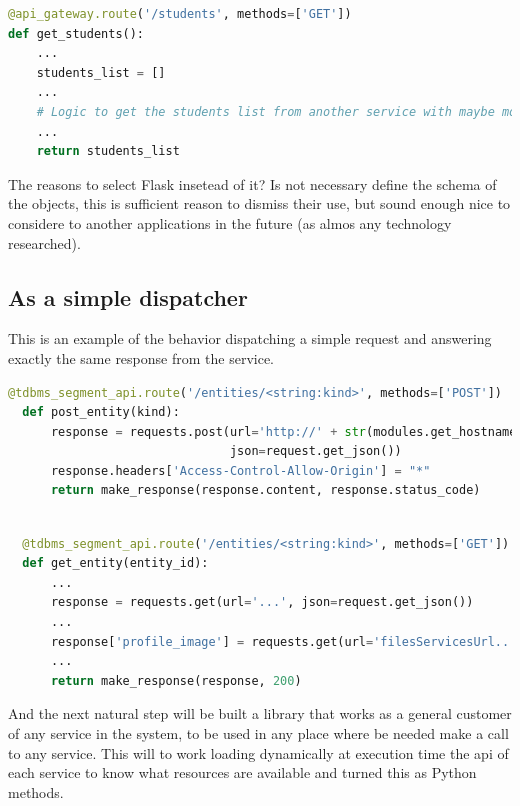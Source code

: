\begin{lstlisting}[language=python,frame=none]
@api_gateway.route('/students', methods=['GET'])
def get_students():
    ...
    students_list = []
    ...
    # Logic to get the students list from another service with maybe more logic.
    ...
    return students_list
\end{lstlisting}

\noindent The reasons to select Flask insetead of it?
Is not necessary define the schema of the objects, this is sufficient reason
to dismiss their use, but sound enough nice to considere to another
applications in the future (as almos any technology researched).


\subsection{As a simple dispatcher}

This is an example of the behavior dispatching a simple request and answering
exactly the same response from the service.

\begin{lstlisting}[language=python,frame=none]
  @tdbms_segment_api.route('/entities/<string:kind>', methods=['POST'])
  def post_entity(kind):
      response = requests.post(url='http://' + str(modules.get_hostname(module='tdbms')) + '/entities/' + str(kind),
                               json=request.get_json())
      response.headers['Access-Control-Allow-Origin'] = "*"
      return make_response(response.content, response.status_code)
\end{lstlisting}


\begin{lstlisting}[language=python,frame=none]

  @tdbms_segment_api.route('/entities/<string:kind>', methods=['GET'])
  def get_entity(entity_id):
      ...
      response = requests.get(url='...', json=request.get_json())
      ...
      response['profile_image'] = requests.get(url='filesServicesUrl...')
      ...
      return make_response(response, 200)
\end{lstlisting}

\noindent And the next natural step will be built a library that works as a general
customer of any service in the system, to be used in any place where be needed
make a call to any service. This will to work loading dynamically at execution
time the api of each service to know what resources are available and turned
this as Python methods.


